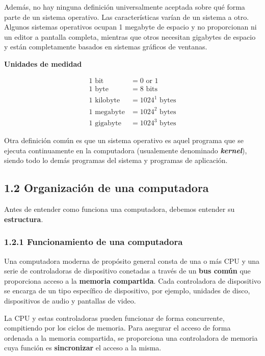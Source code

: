 \documentclass{article}
\begin{document}
Adem\'{a}s, no hay ninguna definici\'{o}n universalmente aceptada sobre qu\'{e} forma parte de un sistema operativo. Las
caracter\'{i}sticas var\'{i}an de un sistema a otro. Algunos sistemas operativos ocupan 1 megabyte de espacio y
no proporcionan ni un editor a pantalla completa, mientras que otros necesitan gigabytes de espacio y est\'{a}n
completamente basados en sistemas gr\'{a}ficos de ventanas.
\medbreak

\begin{center}
    \textbf{Unidades de medidad} 
\end{center}
\begin{align*}
    1 \text{ bit} &= 0 \text{ or } 1 \\ 
    1 \text{ byte} &= 8 \text{ bits} \\ 
    1 \text{ kilobyte} &= 1024^1 \text{ bytes} \\ 
    1 \text{ megabyte} &= 1024^2 \text{ bytes} \\ 
    1 \text{ gigabyte} &= 1024^3 \text{ bytes}
\end{align*}

Otra definici\'{o}n com\'{u}n es que un sistema operativo es aquel programa que se ejecuta continuamente en la
computadora (usualemente denominado \textbf{\textit{kernel}}), siendo todo lo dem\'{a}s programas del sistema y
programas de aplicaci\'{o}n.

\subsection*{1.2 Organizaci\'{o}n de una computadora}
Antes de entender como funciona una computadora, debemos entender su \textbf{estructura}.

\subsubsection*{1.2.1 Funcionamiento de una computadora}
Una computadora moderna de prop\'{o}sito general consta de una o m\'{a}s CPU y una serie de controladoras de dispositivo
conetadas a trav\'{e}s de un \textbf{bus com\'{u}n} que proporciona acceso a la \textbf{memoria compartida}. Cada controladora
de dispositivo se encarga de un tipo espec\'{i}fico de dispositivo, por ejemplo, unidades de disco, dispositivos de audio y  pantallas
de video. 

La CPU y estas controladoras pueden funcionar de forma concurrente, compitiendo por los ciclos de memoria. Para asegurar
el acceso de forma ordenada a la memoria compartida, se proporciona una controladora de memoria cuya funci\'{o}n es \textbf{sincronizar}
el acceso a la misma.
\end{document}

